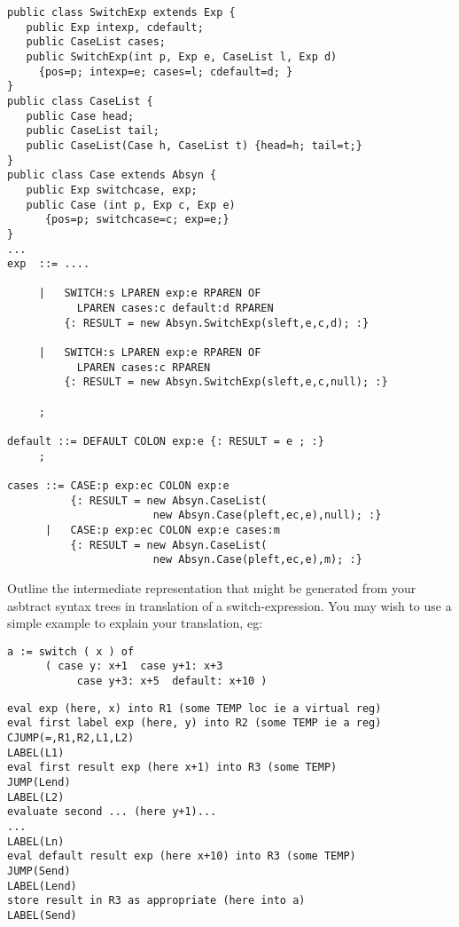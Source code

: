 \documentclass[11pt]{cityexam}
\begin{document}
\begin{questions}
\begin{subquestions}
\begin{modelanswer}
\begin{verbatim}
public class SwitchExp extends Exp {
   public Exp intexp, cdefault;
   public CaseList cases;
   public SwitchExp(int p, Exp e, CaseList l, Exp d) 
     {pos=p; intexp=e; cases=l; cdefault=d; }
}
public class CaseList {
   public Case head;
   public CaseList tail;
   public CaseList(Case h, CaseList t) {head=h; tail=t;}
}
public class Case extends Absyn {
   public Exp switchcase, exp;
   public Case (int p, Exp c, Exp e) 
      {pos=p; switchcase=c; exp=e;}
}
...
exp  ::= ....

     |   SWITCH:s LPAREN exp:e RPAREN OF 
           LPAREN cases:c default:d RPAREN
         {: RESULT = new Absyn.SwitchExp(sleft,e,c,d); :}

     |   SWITCH:s LPAREN exp:e RPAREN OF 
           LPAREN cases:c RPAREN
         {: RESULT = new Absyn.SwitchExp(sleft,e,c,null); :}

     ;

default ::= DEFAULT COLON exp:e {: RESULT = e ; :}
     ;

cases ::= CASE:p exp:ec COLON exp:e
          {: RESULT = new Absyn.CaseList(
                       new Absyn.Case(pleft,ec,e),null); :}
      |   CASE:p exp:ec COLON exp:e cases:m
          {: RESULT = new Absyn.CaseList(
                       new Absyn.Case(pleft,ec,e),m); :}
\end{verbatim}
\end{modelanswer}
 
\subquestion
        Outline the intermediate representation
        that might be generated from your
	asbtract syntax trees in translation of
        a switch-expression.
	You may wish to use a simple example to explain your 
	translation, eg:
\begin{verbatim}
a := switch ( x ) of 
      ( case y: x+1  case y+1: x+3  
           case y+3: x+5  default: x+10 )
\end{verbatim}

\begin{modelanswer}
\begin{verbatim}
eval exp (here, x) into R1 (some TEMP loc ie a virtual reg)
eval first label exp (here, y) into R2 (some TEMP ie a reg)
CJUMP(=,R1,R2,L1,L2)
LABEL(L1)
eval first result exp (here x+1) into R3 (some TEMP)
JUMP(Lend)
LABEL(L2)
evaluate second ... (here y+1)...
...
LABEL(Ln)
eval default result exp (here x+10) into R3 (some TEMP)
JUMP(Send)
LABEL(Lend)
store result in R3 as appropriate (here into a)
LABEL(Send)
\end{verbatim}
\end{modelanswer}


\end{subquestions}
\end{questions}
\end{document}
